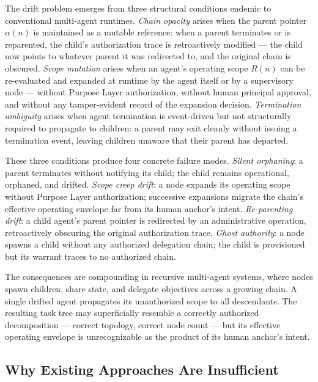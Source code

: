\documentclass[12pt]{article}
\begin{document}
The drift problem emerges from three structural conditions endemic to conventional multi-agent runtimes. \emph{Chain opacity} arises when the parent pointer $\alpha(n)$ is maintained as a mutable reference: when a parent terminates or is reparented, the child's authorization trace is retroactively modified --- the child now points to whatever parent it was redirected to, and the original chain is obscured. \emph{Scope mutation} arises when an agent's operating scope $R(n)$ can be re-evaluated and expanded at runtime by the agent itself or by a supervisory node --- without Purpose Layer authorization, without human principal approval, and without any tamper-evident record of the expansion decision. \emph{Termination ambiguity} arises when agent termination is event-driven but not structurally required to propagate to children: a parent may exit cleanly without issuing a termination event, leaving children unaware that their parent has departed.

These three conditions produce four concrete failure modes. \emph{Silent orphaning}: a parent terminates without notifying its child; the child remains operational, orphaned, and drifted. \emph{Scope creep drift}: a node expands its operating scope without Purpose Layer authorization; successive expansions migrate the chain's effective operating envelope far from its human anchor's intent. \emph{Re-parenting drift}: a child agent's parent pointer is redirected by an administrative operation, retroactively obscuring the original authorization trace. \emph{Ghost authority}: a node spawns a child without any authorized delegation chain; the child is provisioned but its warrant traces to no authorized chain.

The consequences are compounding in recursive multi-agent systems, where nodes spawn children, share state, and delegate objectives across a growing chain. A single drifted agent propagates its unauthorized scope to all descendants. The resulting task tree may superficially resemble a correctly authorized decomposition --- correct topology, correct node count --- but its effective operating envelope is unrecognizable as the product of its human anchor's intent.

\subsection{Why Existing Approaches Are Insufficient}
\end{document}
